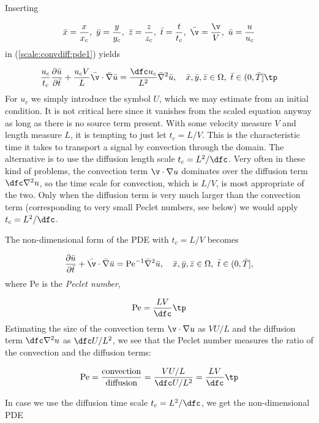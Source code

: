 \documentclass[graybox,envcountchap,sectrefs,final]{svmonodo}
\begin{document}
\vspace{3mm}




\vspace{3mm}



Inserting

\[ \bar x = \frac{x}{x_c},\ \bar y = \frac{y}{y_c},\ \bar z = \frac{z}{z_c},
\ \bar t = \frac{t}{t_c}, \ \bar\v = \frac{\v}{V},
\ \bar u =\frac{u}{u_c}\]
in (\ref{scale:convdiff:pde1}) yields

\[
\frac{u_c}{t_c}
\frac{\partial \bar u}{\partial \bar t} +
\frac{u_c V}{L}\bar\v\cdot\bar\nabla\bar u =
\frac{\dfc u_c}{L^2}\bar\nabla^2\bar u,
\quad \bar x,\bar y,\bar z\in \Omega,\ \bar t\in (0,\bar T]\tp
\]
For $u_c$ we simply introduce the symbol $U$, which we may estimate
from an initial condition. It is not critical here since it vanishes
from the scaled equation anyway as long as there is no source term
present.
With some velocity measure $V$ and length measure $L$, it is
tempting to just let $t_c = L/V$. This is the characteristic time it takes to
transport a signal by convection through the domain.
The alternative is to use the
diffusion length scale $t_c=L^2/\dfc$. Very often in these kind of
problems, the convection term $\v\cdot\nabla u$ dominates over the
diffusion term $\dfc\nabla^2 u$, so the time scale for convection,
which is $L/V$,
is most appropriate of the two. Only when
the diffusion term is very much larger than the convection
term (corresponding to very small Peclet numbers, see below)
we would apply $t_c=L^2/\dfc$.

The non-dimensional form of the PDE with $t_c=L/V$ becomes

\begin{equation}
\frac{\partial \bar u}{\partial \bar t} +
\bar\v\cdot\bar\nabla\bar u =
\hbox{Pe}^{-1}\bar\nabla^2\bar u,
\quad \bar x,\bar y,\bar z\in \Omega,\ \bar t\in (0,\bar T],
\label{scale:convdiff:pde1:d}
\end{equation}
where Pe is the \emph{Peclet number},

\[ \hbox{Pe} = \frac{LV}{\dfc}\tp\]
Estimating the size of the convection term $\v\cdot\nabla u$ as
$VU/L$ and the diffusion term $\dfc\nabla^2 u$ as $\dfc U/L^2$,
we see that the Peclet number measures the ratio of the convection
and the diffusion terms:

\[ \hbox{Pe} = \frac{\hbox{convection}}{\hbox{diffusion}} =
\frac{VU/L}{\dfc U/L^2}= \frac{LV}{\dfc}\tp
\]

In case we use the diffusion time scale
$t_c=L^2/\dfc$, we get the non-dimensional PDE
\end{document}

